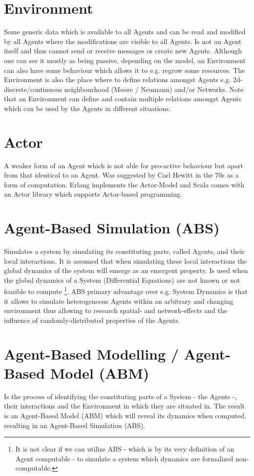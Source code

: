 \documentclass[oneside]{book}
\begin{document}
\section*{Environment}
Some generic data which is available to all Agents and can be read and modified by all Agents where the modifications are visible to all Agents. Is not an Agent itself and thus cannot send or receive messages or create new Agents. Although one can see it mostly as being passive, depending on the model, an Environment can also have some behaviour which allows it to e.g. regrow some resources.
The Environment is also the place where to define relations amongst Agents e.g. 2d-discrete/continuous neighbourhood (Moore / Neumann) and/or Networks. Note that an Environment can define and contain multiple relations amongst Agents which can be used by the Agents in different situations.

\section*{Actor}
A weaker form of an Agent which is not able for pro-active behaviour but apart from that identical to an Agent. Was suggested by Carl Hewitt in the 70s as a form of computation. Erlang implements the Actor-Model and Scala comes with an Actor library which supports Actor-based programming.

\section*{Agent-Based Simulation (ABS)}
Simulates a system by simulating its constituting parts, called Agents, and their local interactions. It is assumed that when simulating these local interactions the global dynamics of the system will emerge as an emergent property.
Is used when the global dynamics of a System (Differential Equations) are not known or not feasible to compute \footnote{It is not clear if we can utilize ABS - which is by its very definition of an Agent computable - to simulate a system which dynamics are formalized non-computable.}.
ABS primary advantage over e.g. System Dynamics is that it allows to simulate heterogeneous Agents within an arbitrary and changing environment thus allowing to research spatial- and network-effects and the influence of randomly-distributed properties of the Agents.

\section*{Agent-Based Modelling / Agent-Based Model (ABM)}
Is the process of identifying the constituting parts of a System - the Agents -, their interactions and the Environment in which they are situated in. The result is an Agent-Based Model (ABM) which will reveal its dynamics when computed, resulting in an Agent-Based Simulation (ABS).
\end{document}
